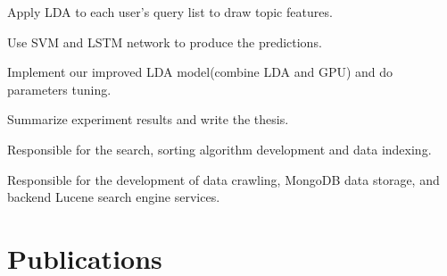 \documentclass[letterpaper]{deedy-resume} %
\begin{document}
\begin{minipage}[t]{0.69\textwidth}
\sectionspace %

\begin{tightitemize}
\item Apply LDA to each user's query list to draw topic features.
\item Use SVM and LSTM network to produce the predictions.
\end{tightitemize}

\sectionspace %

\begin{tightitemize}
\item Implement our improved LDA model(combine LDA and GPU) and do parameters tuning.
\item Summarize experiment results and write the thesis.
\end{tightitemize}

\sectionspace %

\begin{tightitemize}
\item Responsible for the search, sorting algorithm development and data indexing.
\item Responsible for the development of data crawling, MongoDB data storage, and backend Lucene search engine services.
\end{tightitemize}

\sectionspace %


\section{Publications}
\vspace{\topsep} %




\end{minipage}
\end{document}
